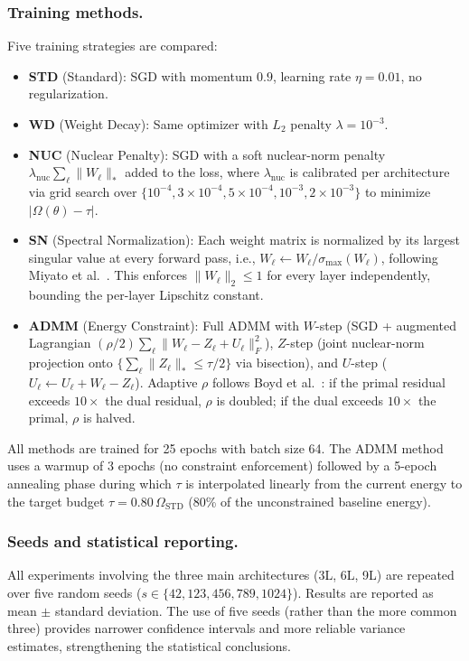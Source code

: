 \documentclass[a4paper,fleqn]{cas-sc}
\theoremstyle{remark}
\theoremstyle{definition}
\begin{document}
\subsubsection{Training methods.}
Five training strategies are compared:
\begin{itemize}
    \item \textbf{STD} (Standard): SGD with momentum $0.9$, learning rate $\eta=0.01$, no regularization.
    \item \textbf{WD} (Weight Decay): Same optimizer with $L_2$ penalty $\lambda=10^{-3}$.
    \item \textbf{NUC} (Nuclear Penalty): SGD with a soft nuclear-norm penalty $\lambda_{\mathrm{nuc}}\sum_\ell\|W_\ell\|_*$ added to the loss, where $\lambda_{\mathrm{nuc}}$ is calibrated per architecture via grid search over $\{10^{-4}, 3\times 10^{-4}, 5\times 10^{-4}, 10^{-3}, 2\times 10^{-3}\}$ to minimize $|\Omega(\theta)-\tau|$.
    \item \textbf{SN} (Spectral Normalization): Each weight matrix is normalized by its largest singular value at every forward pass, i.e., $W_\ell\leftarrow W_\ell/\sigma_{\max}(W_\ell)$, following Miyato et al.~\cite{Miyato2018SpectralNorm}. This enforces $\|W_\ell\|_2\le 1$ for every layer independently, bounding the per-layer Lipschitz constant.
    \item \textbf{ADMM} (Energy Constraint): Full ADMM with $W$-step (SGD + augmented Lagrangian $({\rho}/{2})\sum_\ell\|W_\ell-Z_\ell+U_\ell\|_F^2$), $Z$-step (joint nuclear-norm projection onto $\{\sum_\ell\|Z_\ell\|_*\le\tau/2\}$ via bisection), and $U$-step ($U_\ell\leftarrow U_\ell+W_\ell-Z_\ell$). Adaptive $\rho$ follows Boyd et al.~\cite{Boyd2011ADMM}: if the primal residual exceeds $10\times$ the dual residual, $\rho$ is doubled; if the dual exceeds $10\times$ the primal, $\rho$ is halved.
\end{itemize}
All methods are trained for 25 epochs with batch size 64. The ADMM method uses a warmup of 3 epochs (no constraint enforcement) followed by a 5-epoch annealing phase during which $\tau$ is interpolated linearly from the current energy to the target budget $\tau=0.80\,\Omega_{\mathrm{STD}}$ (80\% of the unconstrained baseline energy).

\subsubsection{Seeds and statistical reporting.}
All experiments involving the three main architectures (3L, 6L, 9L) are repeated over five random seeds ($s\in\{42,123,456,789,1024\}$). Results are reported as mean $\pm$ standard deviation. The use of five seeds (rather than the more common three) provides narrower confidence intervals and more reliable variance estimates, strengthening the statistical conclusions.
\end{document}
